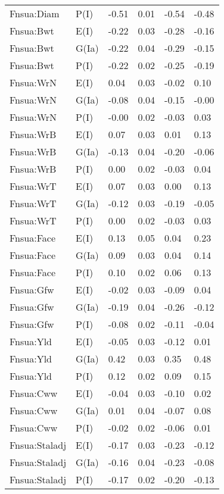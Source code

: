 \begin{center}
\begin{longtable}{|p{1.1in}|p{0.7in}|p{0.7in}|p{0.6in}|p{0.6in}|p{0.6in}|}
  Fnsua:Diam & P(I) & -0.51 & 0.01 & -0.54 & -0.48 \\ 
  Fnsua:Bwt & E(I) & -0.22 & 0.03 & -0.28 & -0.16 \\ 
  Fnsua:Bwt & G(Ia) & -0.22 & 0.04 & -0.29 & -0.15 \\ 
  Fnsua:Bwt & P(I) & -0.22 & 0.02 & -0.25 & -0.19 \\ 
  Fnsua:WrN & E(I) & 0.04 & 0.03 & -0.02 & 0.10 \\ 
  Fnsua:WrN & G(Ia) & -0.08 & 0.04 & -0.15 & -0.00 \\ 
  Fnsua:WrN & P(I) & -0.00 & 0.02 & -0.03 & 0.03 \\ 
  Fnsua:WrB & E(I) & 0.07 & 0.03 & 0.01 & 0.13 \\ 
  Fnsua:WrB & G(Ia) & -0.13 & 0.04 & -0.20 & -0.06 \\ 
  Fnsua:WrB & P(I) & 0.00 & 0.02 & -0.03 & 0.04 \\ 
  Fnsua:WrT & E(I) & 0.07 & 0.03 & 0.00 & 0.13 \\ 
  Fnsua:WrT & G(Ia) & -0.12 & 0.03 & -0.19 & -0.05 \\ 
  Fnsua:WrT & P(I) & 0.00 & 0.02 & -0.03 & 0.03 \\ 
  Fnsua:Face & E(I) & 0.13 & 0.05 & 0.04 & 0.23 \\ 
  Fnsua:Face & G(Ia) & 0.09 & 0.03 & 0.04 & 0.14 \\ 
  Fnsua:Face & P(I) & 0.10 & 0.02 & 0.06 & 0.13 \\ 
  Fnsua:Gfw & E(I) & -0.02 & 0.03 & -0.09 & 0.04 \\ 
  Fnsua:Gfw & G(Ia) & -0.19 & 0.04 & -0.26 & -0.12 \\ 
  Fnsua:Gfw & P(I) & -0.08 & 0.02 & -0.11 & -0.04 \\ 
  Fnsua:Yld & E(I) & -0.05 & 0.03 & -0.12 & 0.01 \\ 
  Fnsua:Yld & G(Ia) & 0.42 & 0.03 & 0.35 & 0.48 \\ 
  Fnsua:Yld & P(I) & 0.12 & 0.02 & 0.09 & 0.15 \\ 
  Fnsua:Cww & E(I) & -0.04 & 0.03 & -0.10 & 0.02 \\ 
  Fnsua:Cww & G(Ia) & 0.01 & 0.04 & -0.07 & 0.08 \\ 
  Fnsua:Cww & P(I) & -0.02 & 0.02 & -0.06 & 0.01 \\ 
  Fnsua:Staladj & E(I) & -0.17 & 0.03 & -0.23 & -0.12 \\ 
  Fnsua:Staladj & G(Ia) & -0.16 & 0.04 & -0.23 & -0.08 \\ 
  Fnsua:Staladj & P(I) & -0.17 & 0.02 & -0.20 & -0.13 \\ 

\end{longtable}
\end{center}
